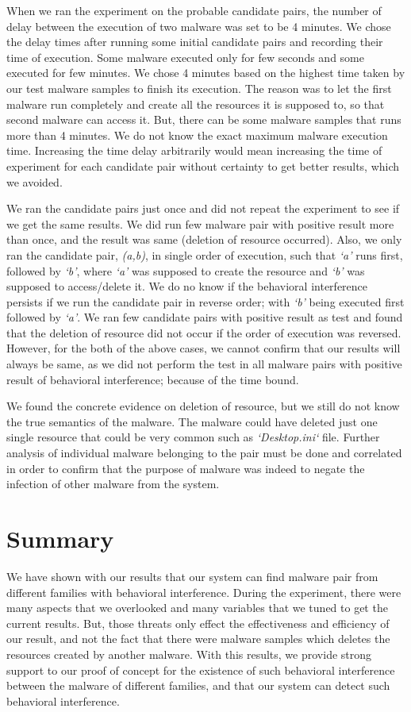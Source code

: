 When we ran the experiment on the probable candidate pairs, the number of delay between the execution of two malware was set to be 4 minutes.
We chose the delay times after running some initial candidate pairs and recording their time of execution.
Some malware executed only for few seconds and some executed for few minutes.
We chose 4 minutes based on the highest time taken by our test malware samples to finish its execution.
The reason was to let the first malware run completely and create all the resources it is supposed to, so that second malware can access it.
But, there can be some malware samples that runs more than 4 minutes.
We do not know the exact maximum malware execution time.
Increasing the time delay arbitrarily would mean increasing the time of experiment for each candidate pair without certainty to get better results, which we avoided.

We ran the candidate pairs just once and did not repeat the experiment to see if we get the same results.
We did run few malware pair with positive result more than once, and the result was same (deletion of resource occurred).
Also, we only ran the candidate pair, \emph{(a,b)}, in single order of execution, such that \emph{`a'} runs first, followed by \emph{`b'}, where \emph{`a'} was supposed to create the resource and \emph{`b'} was supposed to access/delete it.
We do no know if the behavioral interference persists if we run the candidate pair in reverse order; with \emph{`b'} being executed first followed by \emph{`a'}.
We ran few candidate pairs with positive result as test and found that the deletion of resource did not occur if the order of execution was reversed.
However, for the both of the above cases, we cannot confirm that our results will always be same, as we did not perform the test in all malware pairs with positive result of behavioral interference; because of the time bound.

We found the concrete evidence on deletion of resource, but we still do not know the true semantics of the malware.
The malware could have deleted just one single resource that could be very common such as \emph{`Desktop.ini`} file.
Further analysis of individual malware belonging to the pair must be done and correlated in order to confirm that the purpose of malware was indeed to negate the infection of other malware from the system.
\section{Summary}
\label{sec:Summary}

We have shown with our results that our system can find malware pair from different families with behavioral interference.
During the experiment, there were  many aspects that we overlooked and many variables that we tuned to get the current results.
But, those threats only effect the effectiveness and efficiency of our result, and not the fact that there were malware samples which deletes the resources created by another malware.
With this results, we provide strong support to our proof of concept for the existence of such behavioral interference between the malware of different families, and that our system can detect such behavioral interference.

